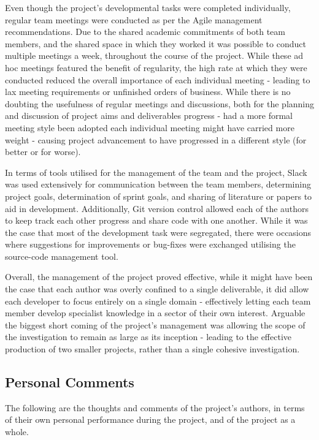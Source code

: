 Even though the project's developmental tasks were completed individually,
regular team meetings were conducted as per the Agile management
recommendations.
Due to the shared academic commitments of both team members, and the shared
space in which they worked it was possible to conduct multiple meetings a
week, throughout the course of the project.
While these ad hoc meetings featured the benefit of regularity, the high rate
at which they were conducted reduced the overall importance of each individual
meeting - leading to lax meeting requirements or unfinished orders of business.
While there is no doubting the usefulness of regular meetings and discussions,
both for the planning and discussion of project aims and deliverables
progress - had a more formal meeting style been adopted each individual meeting
might have carried more weight - causing project advancement to have
progressed in a different style (for better or for worse).

In terms of tools utilised for the management of the team and the project,
Slack was used extensively for communication between the team members,
determining project goals, determination of sprint goals, and sharing of
literature or papers to aid in development.
Additionally, Git version control allowed each of the authors to keep track
each other progress and share code with one another.
While it was the case that most of the development task were segregated, there
were occasions where suggestions for improvements or bug-fixes were exchanged
utilising the source-code management tool.

Overall, the management of the project proved effective, while it might have
been the case that each author was overly confined to a single deliverable,
it did allow each developer to focus entirely on a single domain - effectively
letting each team member develop specialist knowledge in a sector of their
own interest.
Arguable the biggest short coming of the project's management was allowing
the scope of the investigation to remain as large as its inception - leading
to the effective production of two smaller projects, rather than a single
cohesive investigation.

\subsection{Personal Comments}
The following are the thoughts and comments of the project's authors,
in terms of their own personal performance during the project, and of the
project as a whole.

